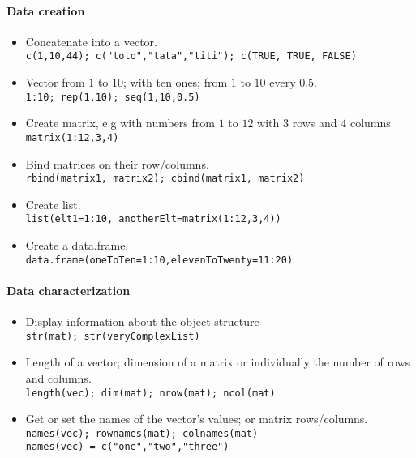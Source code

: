 \documentclass[a4paper,11pt]{article}
\begin{document}
\paragraph{Data creation}
\begin{itemize}
  \item Concatenate into a vector. \\ 
    \verb!c(1,10,44); c("toto","tata","titi"); c(TRUE, TRUE, FALSE)!
  \item Vector from $1$ to $10$; with ten ones; from $1$ to $10$ every $0.5$. \\ 
    \verb!1:10; rep(1,10); seq(1,10,0.5)!
  \item Create matrix, e.g with numbers from $1$ to $12$ with $3$ rows and $4$ columns\\
    \verb!matrix(1:12,3,4)!
  \item Bind matrices on their row/columns. \\
    \verb!rbind(matrix1, matrix2); cbind(matrix1, matrix2)!
  \item Create list. \\
    \verb!list(elt1=1:10, anotherElt=matrix(1:12,3,4))!
  \item Create a data.frame.\\
    \verb!data.frame(oneToTen=1:10,elevenToTwenty=11:20)!
\end{itemize}


\paragraph{Data characterization} 
\begin{itemize} 
  \item Display information about the object structure\\ 
    \verb!str(mat); str(veryComplexList)!
  \item Length of a vector; dimension of a matrix or individually the number of rows and columns.\\
    \verb!length(vec); dim(mat); nrow(mat); ncol(mat)!
  \item Get or set the names of the vector's values; or matrix rows/columns.\\
    \verb!names(vec); rownames(mat); colnames(mat)! \\
    \verb!names(vec) = c("one","two","three")!
\end{itemize}


\end{document}

